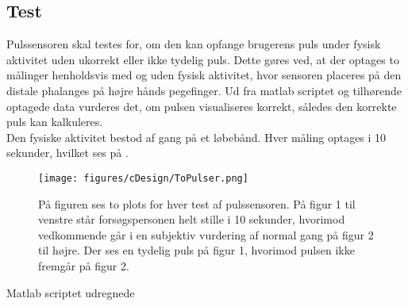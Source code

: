 \subsection{Test}
Pulssensoren skal testes for, om den kan opfange brugerens puls under fysisk aktivitet uden ukorrekt eller ikke tydelig puls. Dette gøres ved, at der optages to målinger henholdsvis med og uden fysisk aktivitet, hvor sensoren placeres på den distale phalanges på højre hånds pegefinger. Ud fra matlab scriptet og tilhørende optagede data vurderes det, om pulsen visualiseres korrekt, således den korrekte puls kan kalkuleres.\\
Den fysiske aktivitet bestod af gang på et løbebånd. Hver måling optages i 10 sekunder, hvilket ses på .\\
\begin{figure}[H]
	\centering
	\texttt{[image: figures/cDesign/ToPulser.png]}
	\caption{På figuren ses to plots for hver test af pulssensoren. På figur 1 til venstre står forsøgspersonen helt stille i 10 sekunder, hvorimod vedkommende går i en subjektiv vurdering af normal gang på figur 2 til højre. Der ses en tydelig puls på figur 1, hvorimod pulsen ikke fremgår på figur 2.}
	\label{fig:puls_m_u}
\end{figure}
Matlab scriptet udregnede



